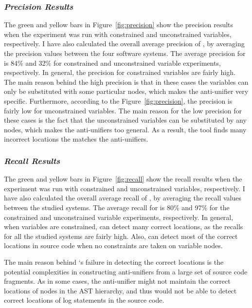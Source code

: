 \subsubsection{\emph{Precision Results}}  \label{precision-results}
The green and yellow bars in Figure~\ref{fig:precision}  show the precision results when the experiment was run with constrained and unconstrained variables, respectively. I have also calculated the overall average precision of , by averaging the precision values between the four software systems. The average precision for  is 84\% and 32\% for constrained and unconstrained variable experiments, respectively. In general, the precision for constrained variables are fairly high. The main reason behind the high precision is that in these cases the variables can only be substituted with some particular nodes, which makes the anti-unifier very specific. Furthermore, according to the Figure~\ref{fig:precision}, the precision is fairly low for unconstrained variables. The main reason for the low precision for these cases is the fact that the unconstrained variables can be substituted by any nodes, which makes the anti-unifiers too general. As a result, the tool finds many incorrect locations the matches the anti-unifiers.

\subsubsection{\emph{Recall Results}}  \label{recall-results}
The green and yellow bars in Figure~\ref{fig:recall}  show the recall results when the experiment was run with constrained and unconstrained variables, respectively. I have also calculated the overall average recall of , by averaging the recall values between the studied systems. The average recall for  is 80\% and 97\% for the constrained and unconstrained variable experiments, respectively. In general, when variables are constrained,  can detect many correct locations, as the recalls for all the studied systems are fairly high. Also,  can detect most of the correct locations in source code when no constraints are taken on variable nodes.

The main reason behind `s failure in detecting the correct locations is the potential complexities in constructing anti-unifiers from a large set of source code fragments. As in some cases, the anti-unifier might not maintain the correct locations of nodes in the AST hierarchy, and thus  would not be able to detect correct locations of log statements in the source code.


